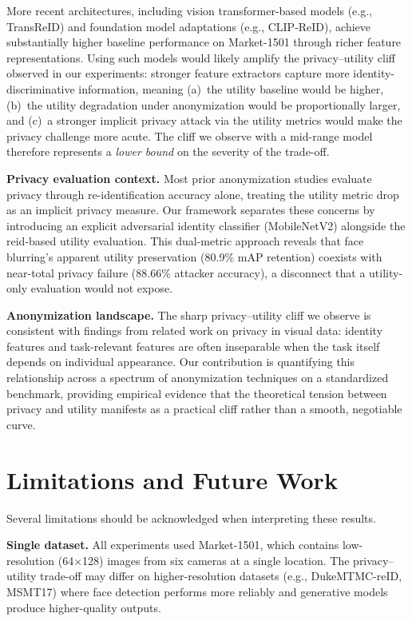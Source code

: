 More recent architectures, including vision transformer-based models (e.g., TransReID) and foundation model adaptations (e.g., CLIP-ReID), achieve substantially higher baseline performance on Market-1501 through richer feature representations. Using such models would likely amplify the privacy--utility cliff observed in our experiments: stronger feature extractors capture more identity-discriminative information, meaning (a)~the utility baseline would be higher, (b)~the utility degradation under anonymization would be proportionally larger, and (c)~a stronger implicit privacy attack via the utility metrics would make the privacy challenge more acute. The cliff we observe with a mid-range model therefore represents a \textit{lower bound} on the severity of the trade-off.

\textbf{Privacy evaluation context.} Most prior anonymization studies evaluate privacy through re-identification accuracy alone, treating the utility metric drop as an implicit privacy measure. Our framework separates these concerns by introducing an explicit adversarial identity classifier (MobileNetV2) alongside the \acrshort{reid}-based utility evaluation. This dual-metric approach reveals that face blurring's apparent utility preservation (80.9\% mAP retention) coexists with near-total privacy failure (88.66\% attacker accuracy), a disconnect that a utility-only evaluation would not expose.

\textbf{Anonymization landscape.} The sharp privacy--utility cliff we observe is consistent with findings from related work on privacy in visual data: identity features and task-relevant features are often inseparable when the task itself depends on individual appearance. Our contribution is quantifying this relationship across a spectrum of anonymization techniques on a standardized benchmark, providing empirical evidence that the theoretical tension between privacy and utility manifests as a practical cliff rather than a smooth, negotiable curve.


\section{Limitations and Future Work}

Several limitations should be acknowledged when interpreting these results.

\textbf{Single dataset.} All experiments used Market-1501, which contains low-resolution (64$\times$128) images from six cameras at a single location. The privacy--utility trade-off may differ on higher-resolution datasets (e.g., DukeMTMC-reID, MSMT17) where face detection performs more reliably and generative models produce higher-quality outputs.

